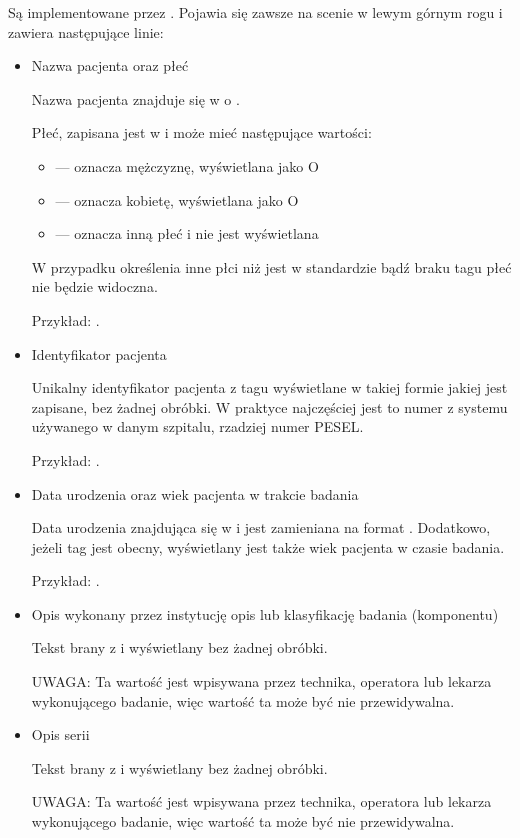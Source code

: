 Są implementowane przez .
Pojawia się zawsze na scenie w lewym górnym rogu i zawiera następujące linie:
\begin{itemize}
    \item Nazwa pacjenta oraz płeć

          Nazwa pacjenta znajduje się w  o .

          Płeć, zapisana jest w  i może mieć następujące wartości:
          \begin{itemize}
              \item {} --- oznacza mężczyznę, wyświetlana jako O
              \item {} --- oznacza kobietę, wyświetlana jako O
              \item {} --- oznacza inną płeć i nie jest wyświetlana
          \end{itemize}

          W przypadku określenia inne płci niż jest w standardzie bądź braku tagu płeć nie będzie widoczna.

          Przykład: .

    \item Identyfikator pacjenta

          Unikalny identyfikator pacjenta z tagu  wyświetlane w takiej formie jakiej jest zapisane, bez żadnej obróbki.
          W praktyce najczęściej jest to numer z systemu używanego w danym szpitalu, rzadziej numer PESEL.

          Przykład: .

    \item Data urodzenia oraz wiek pacjenta w trakcie badania

          Data urodzenia znajdująca się w  i jest zamieniana na format .
          Dodatkowo, jeżeli tag  jest obecny, wyświetlany jest także wiek pacjenta w czasie badania.

          Przykład: .

    \item Opis wykonany przez instytucję opis lub klasyfikację badania (komponentu)

          Tekst brany z  i wyświetlany bez żadnej obróbki.

          UWAGA: Ta wartość jest wpisywana przez technika, operatora lub lekarza wykonującego badanie, więc wartość ta może być nie przewidywalna.

    \item Opis serii

          Tekst brany z  i wyświetlany bez żadnej obróbki.

          UWAGA: Ta wartość jest wpisywana przez technika, operatora lub lekarza wykonującego badanie, więc wartość ta może być nie przewidywalna.
\end{itemize}

